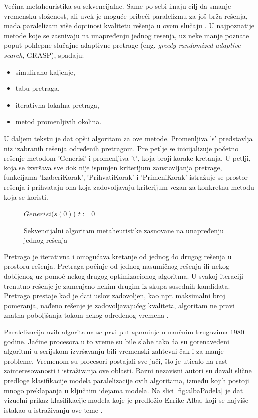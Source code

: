 \documentclass[a4paper]{article}
\newenvironment{algoritam}[1][htb]
{\renewcommand{\algorithmcfname}{Algoritam}
\begin{figure}[ht]
\centering
  \begin{minipage}{.75\linewidth}
	\begin{algorithm}[#1]%
  }{\end{algorithm}
  \end{minipage}
\end{figure}}
\begin{document}
Većina metaheuristika su sekvencijalne. Same po sebi imaju cilj da smanje vremensku složenost, ali uvek je moguće pribeći paralelizmu za još brža rešenja, mada paralelizam više doprinosi kvalitetu rešenja u ovom slučaju \cite{alba2}. U najpoznatije metode koje se zasnivaju na unapređenju jednog resenja, uz neke manje poznate poput pohlepne slučajne adaptivne pretrage (eng. \textit{greedy randomized adaptive search}, GRASP), spadaju:

\begin{itemize} 
\item simulirano kaljenje,
\item tabu pretraga,
\item iterativna lokalna pretraga,
\item metod promenljivih okolina.
\end{itemize}

U daljem tekstu je dat opšti algoritam za ove metode. Promenljiva 's' predstavlja niz izabranih rešenja određenih pretragom. Pre petlje se inicijalizuje početno rešenje metodom 'Generisi' i promenljiva 't', koja broji korake kretanja.
U petlji, koja se izvršava sve dok nije ispunjen kriterijum zaustavljanja pretrage, funkcijama 'IzaberiKorak', 'PrihvatiKorak' i 'PrimeniKorak' istražuje se prostor rešenja i prihvataju ona koja zadovoljavaju kriterijum vezan za konkretnu metodu koja se koristi.

\begin{algoritam}[H]
\SetAlgoLined
 $Generisi(s(0)$)\;
 $t := 0$\;
\caption{Sekvencijalni algoritam metaheuristike zasnovane na unapređenju jednog rešenja}
\end{algoritam}

Pretraga je iterativna i omogućava kretanje od jednog do drugog rešenja u prostoru rešenja. Pretraga počinje od jednog nasumičnog rešenja ili nekog dobijenog uz pomoć nekog drugog optimizacionog algoritma. U svakoj iteraciji trenutno rešenje je zamenjeno nekim drugim iz skupa susednih kandidata. Pretraga prestaje kad je dati uslov zadovoljen, kao npr. maksimalni broj pomeranja, nađeno rešenje je zadovoljavajućeg kvaliteta, algoritam ne pravi znatna poboljšanja tokom nekog određenog vremena \cite{alba2}.

Paralelizacija ovih algoritama se prvi put spominje u naučnim krugovima 1980. godine. Jačine procesora u to vreme su bile slabe tako da su gorenavedeni algoritmi u serijskom izvršavanju bili vremenski zahtevni čak i za manje probleme. Vremenom su procesori postajali sve jači, što je uticalo na rast zainteresovanosti i istraživanja ove oblasti. Razni nezavisni autori su davali slične predloge klasifikacije modela paralelizacije ovih algoritama, između kojih postoji mnogo preklapanja u ključnim idejama modela. Na slici \ref{fig:albaPodela} je dat vizuelni prikaz klasifikacije modela koje je predložio Enrike Alba, koji se najviše istakao u istraživanju ove teme \cite{alba}.
\end{document}
